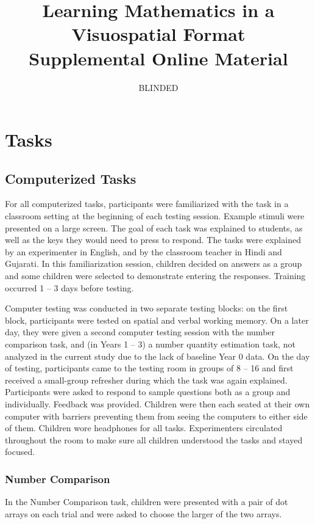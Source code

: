 \documentclass[11pt]{article}
\title{Learning Mathematics in a Visuospatial Format\\ Supplemental Online Material}
\author{BLINDED}
\date{}
\begin{document}
\maketitle
\tableofcontents
\newpage

\section{Tasks}

\subsection{Computerized Tasks}

For all computerized tasks, participants were familiarized with the task in a classroom setting at the beginning of each testing session. Example stimuli were presented on a large screen. The goal of each task was explained to students, as well as the keys they would need to press to respond. The tasks were explained by an experimenter in English, and by the classroom teacher in Hindi and Gujarati. In this familiarization session, children decided on answers as a group and some children were selected to demonstrate entering the responses. Training occurred 1 -- 3 days before testing. 

Computer testing was conducted in two separate testing blocks: on the first block, participants were tested on spatial and verbal working memory. On a later day, they were given a second computer testing session with the number comparison task, and (in Years 1 -- 3) a number quantity estimation task, not analyzed in the current study due to the lack of baseline Year 0 data. On the day of testing, participants came to the testing room in groups of 8 -- 16 and first received a small-group refresher during which the task was again explained.  Participants were asked to respond to sample questions both as a group and individually. Feedback was provided. Children were then each seated at their own computer with barriers preventing them from seeing the computers to either side of them. Children wore headphones for all tasks. Experimenters circulated throughout the room to make sure all children understood the tasks and stayed focused.

\subsubsection{Number Comparison}

In the Number Comparison task, children were presented with a pair of dot arrays on each trial and were asked to choose the larger of the two arrays. 
\end{document}
